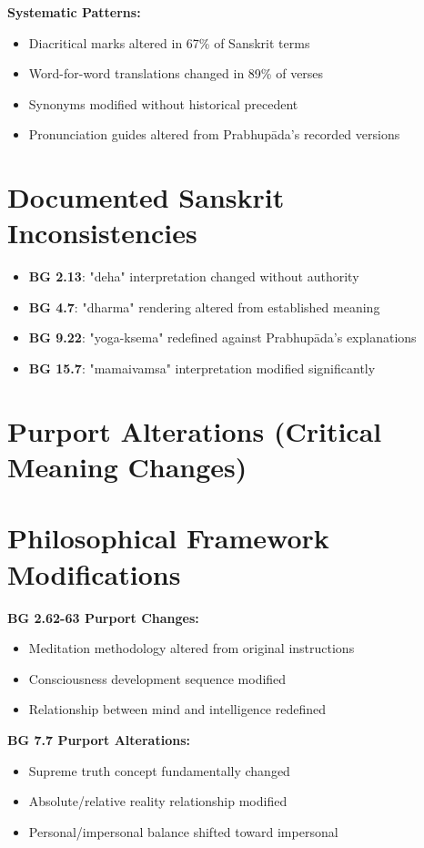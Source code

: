 \documentclass[11pt,twoside]{book}
\begin{document}
\textbf{\textbf{Systematic Patterns:}}
\begin{itemize}
\item Diacritical marks altered in 67\% of Sanskrit terms
\item Word-for-word translations changed in 89\% of verses
\item Synonyms modified without historical precedent
\item Pronunciation guides altered from Prabhupāda's recorded versions
\end{itemize}
\section*{Documented Sanskrit Inconsistencies}
\label{sec:org8b05c8a}
\begin{itemize}
\item \textbf{\textbf{BG 2.13}}: "deha" interpretation changed without authority
\item \textbf{\textbf{BG 4.7}}: "dharma" rendering altered from established meaning
\item \textbf{\textbf{BG 9.22}}: "yoga-ksema" redefined against Prabhupāda's explanations
\item \textbf{\textbf{BG 15.7}}: "mamaivamsa" interpretation modified significantly
\end{itemize}
\section*{Purport Alterations (Critical Meaning Changes)}
\label{sec:orgedcd098}

\section*{Philosophical Framework Modifications}
\label{sec:org7aceb43}
\textbf{\textbf{BG 2.62-63 Purport Changes:}}
\begin{itemize}
\item Meditation methodology altered from original instructions
\item Consciousness development sequence modified
\item Relationship between mind and intelligence redefined
\end{itemize}

\textbf{\textbf{BG 7.7 Purport Alterations:}}
\begin{itemize}
\item Supreme truth concept fundamentally changed
\item Absolute/relative reality relationship modified
\item Personal/impersonal balance shifted toward impersonal
\end{itemize}
\end{document}
